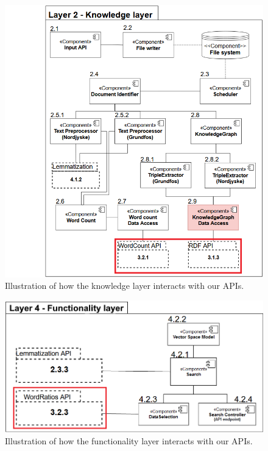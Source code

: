 \begin{figure}[H]
    \centering
    \includegraphics[scale=0.5]{Images/PipeLineLayer2.png}
    \caption{Illustration of how the knowledge layer interacts with our APIs.}
    \label{PipelineLayer2}
\end{figure}

\begin{figure}[H]
    \centering
    \includegraphics[scale=0.4]{Images/PipeLineLayer4SE.png}
    \caption{Illustration of how the functionality layer interacts with our APIs.}
    \label{PipelineLayer4}
\end{figure}

